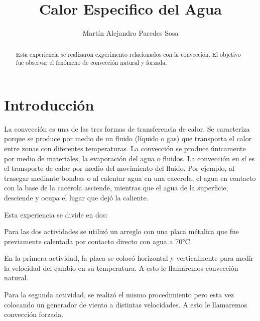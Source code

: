 \documentclass[12pt]{article}
\title{Calor Especifico del Agua}
\author{Martín Alejandro Paredes Sosa}
\makeatletter
\let\thetitle\@title
\let\theauthor\@author
\makeatother
\begin{document}
\begin{center}
{ \large \bfseries \thetitle}
\end{center}
	\begin{minipage}{\textwidth}
		\begin{center} 
			\theauthor 
			\end{center}
	\end{minipage}
	\begin{abstract}
		Esta experiencia se realizaron experimento relacionados con la convección. El objetivo fue observar el fenómeno de convección natural y forzada.
	\end{abstract}

\section{Introducción}
\vspace{-0.5cm}
La convección es una de las tres formas de transferencia de calor. Se caracteriza porque se produce por medio de un fluido (líquido o gas) que transporta el calor entre zonas con diferentes temperaturas. La convección se produce únicamente por medio de materiales, la evaporación del agua o fluidos. La convección en sí es el transporte de calor por medio del movimiento del fluido. Por ejemplo, al trasegar mediante bombas o al calentar agua en una cacerola, el agua en contacto con la base de la cacerola asciende, mientras que el agua de la superficie, desciende y ocupa el lugar que dejó la caliente.

Esta experiencia se divide en dos:

Para las dos actividades se utilizó un arreglo con una placa métalica que fue previamente calentada por contacto directo con agua a 70°C. 

En la primera actividad, la placa se colocó horizontal y verticalmente para medir la velocidad del cambio en su temperatura. A esto le llamaremos convección natural.

Para la segunda actividad, se realizó el mismo procedimiento pero esta vez colocando un generador de viento a distintas velocidades. A esto le llamaremos convección forzada.

\end{document}
